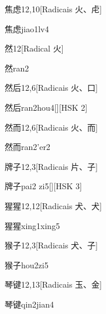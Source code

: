 \begin{entry}{焦虑}{12,10}[Radicais ⽕、⾌]
  \begin{phonetics}{焦虑}{jiao1lv4}
  \end{phonetics}
\end{entry}

\begin{entry}{然}{12}[Radical ⽕]
  \begin{phonetics}{然}{ran2}
  \end{phonetics}
\end{entry}

\begin{entry}{然后}{12,6}[Radicais ⽕、⼝]
  \begin{phonetics}{然后}{ran2hou4}[][HSK 2]
  \end{phonetics}
\end{entry}

\begin{entry}{然而}{12,6}[Radicais ⽕、⽽]
  \begin{phonetics}{然而}{ran2'er2}
  \end{phonetics}
\end{entry}

\begin{entry}{牌子}{12,3}[Radicais ⽚、⼦]
  \begin{phonetics}{牌子}{pai2 zi5}[][HSK 3]
  \end{phonetics}
\end{entry}

\begin{entry}{猩猩}{12,12}[Radicais ⽝、⽝]
  \begin{phonetics}{猩猩}{xing1xing5}
  \end{phonetics}
\end{entry}

\begin{entry}{猴子}{12,3}[Radicais ⽝、⼦]
  \begin{phonetics}{猴子}{hou2zi5}
  \end{phonetics}
\end{entry}

\begin{entry}{琴键}{12,13}[Radicais ⽟、⾦]
  \begin{phonetics}{琴键}{qin2jian4}
  \end{phonetics}
\end{entry}

